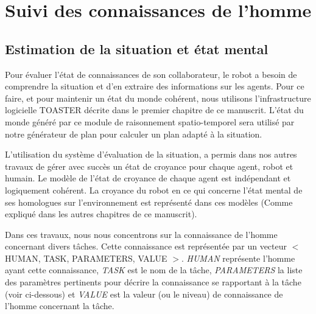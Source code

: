 \documentclass[a4paper,11pt,twoside]{StyleThese}
\begin{document}
\section{Suivi des connaissances de l'homme}

\subsection{Estimation de la situation et état mental}

Pour évaluer l'état de connaissances de son collaborateur, le robot a besoin de comprendre la situation et d'en extraire des informations sur les agents.
Pour ce faire, et pour maintenir un état du monde cohérent, nous utilisons l'infrastructure logicielle TOASTER décrite dans le premier chapitre de ce manuscrit. L'état du monde généré par ce module de raisonnement spatio-temporel sera utilisé par notre générateur de plan pour calculer un plan adapté à la situation.



L'utilisation du système d'évaluation de la situation, a permis dans nos autres travaux de gérer avec succès un état de croyance pour chaque agent, robot et humain. Le modèle de l'état de croyance de chaque agent est indépendant et logiquement cohérent. La croyance du robot en ce qui concerne l'état mental de ses homologues sur l'environnement est représenté dans ces modèles (Comme expliqué dans les autres chapitres de ce manuscrit).

Dans ces travaux, nous nous concentrons sur la connaissance de l'homme concernant divers tâches. Cette connaissance est représentée par un vecteur $<$ HUMAN, TASK, PARAMETERS, VALUE $> $.
\textit{HUMAN} représente l'homme ayant cette connaissance, \textit{TASK} est le nom de la tâche, \textit{PARAMETERS} la liste des paramètres pertinents pour décrire la connaissance se rapportant à la tâche (voir ci-dessous) et \textit{VALUE} est la valeur (ou le niveau) de connaissance de l'homme concernant la tâche.
\end{document}
